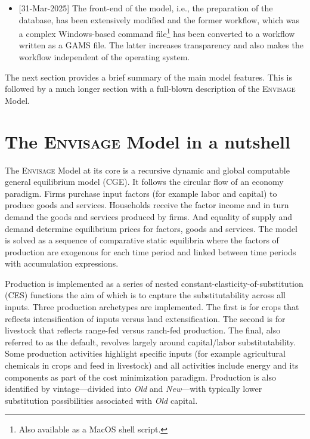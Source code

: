 \documentclass[11pt,letterpaper]{report}
\begin{document}
\begin{itemize}
{value shares.\footnote{This comes close to the GEMPACK implementation of
CGE models, albeit the interpretations of the share parameters differ as in
the case of the model in levels, the share parameters are fixed at base
year levels, whereas in the GEMPACK models, the share parameters reflect
the contemporaneous value shares.} The description of the model herein
is based on a version of the model calibrated in levels, thus the normalization
is implicit. In the code, all formulas adhere to the normalized levels of
the variables that are scaled when needed, such as for accounting relations.}
\item{[31-Mar-2025] The front-end of the model, i.e., the preparation
of the database, has been extensively modified and the former workflow,
which was a complex Windows-based command file\footnote{Also available as
a MacOS shell script.} has been converted to a workflow written as
a GAMS file. The latter increases transparency and also makes the workflow
independent of the operating system.}
\end{itemize}

The next section provides a brief summary of the main model features. This is
followed by a much longer section with a full-blown description of the
\textsc{Envisage} Model.

\chapter{The \textsc{Envisage} Model in a nutshell}

The \textsc{Envisage} Model at its core is a recursive dynamic and global
computable general equilibrium model (CGE). It follows the circular flow of an
economy paradigm. Firms purchase input factors (for example labor and capital)
to produce goods and services. Households receive the factor income and in turn
demand the goods and services produced by firms. And equality of supply and
demand determine equilibrium prices for factors, goods and services. The model
is solved as a sequence of comparative static equilibria where the factors of
production are exogenous for each time period and linked between time periods
with accumulation expressions.

Production is implemented as a series of nested
constant-elasticity-of-substitution (CES) functions the aim of which is to
capture the substitutability across all inputs. Three production archetypes are
implemented. The first is for crops that reflects intensification of inputs
versus land extensification. The second is for livestock that reflects
range-fed versus ranch-fed production. The final, also referred to as the
default, revolves largely around capital/labor substitutability. Some production
activities highlight specific inputs (for example agricultural chemicals in
crops and feed in livestock) and all activities include energy and its
components as part of the cost minimization paradigm. Production is also
identified by vintage---divided into \emph{Old} and \emph{New}---with typically
lower substitution possibilities associated with \emph{Old} capital.
\end{document}
